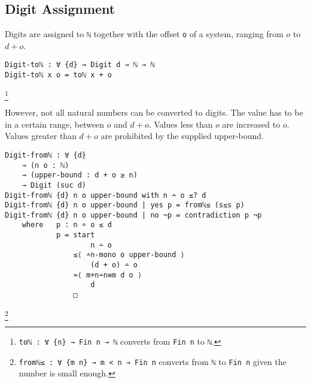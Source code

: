 \documentclass[\main/thesis.tex]{subfiles}
\begin{document}
\subsection{Digit Assignment}

\begin{center}
    \begin{adjustbox}{max width=\textwidth}
    \end{adjustbox}
\end{center}

Digits are assigned to {\lstinline|ℕ|} together with the offset {\lstinline|o|}
of a system, ranging from $ o $ to $ d + o $.

\begin{lstlisting}
Digit-toℕ : ∀ {d} → Digit d → ℕ → ℕ
Digit-toℕ x o = toℕ x + o
\end{lstlisting}
\footnote{
    {\lstinline|toℕ : ∀ {n} → Fin n → ℕ|}
    \newline\hspace*{4em} converts from {\lstinline|Fin n|} to {\lstinline|ℕ|}.
}

However, not all natural numbers can be converted to digits.
The value has to be in a certain range, between $ o $ and $ d + o $.
Values less than $ o $ are increased to $ o $.
Values greater than $ d + o $ are prohibited by the supplied upper-bound.

\begin{lstlisting}
Digit-fromℕ : ∀ {d}
    → (n o : ℕ)
    → (upper-bound : d + o ≥ n)
    → Digit (suc d)
Digit-fromℕ {d} n o upper-bound with n ∸ o ≤? d
Digit-fromℕ {d} n o upper-bound | yes p = fromℕ≤ (s≤s p)
Digit-fromℕ {d} n o upper-bound | no ¬p = contradiction p ¬p
    where   p : n ∸ o ≤ d
            p = start
                    n ∸ o
                ≤⟨ ∸n-mono o upper-bound ⟩
                    (d + o) ∸ o
                ≈⟨ m+n∸n≡m d o ⟩
                    d
                □
\end{lstlisting}
\footnote{
    {\lstinline|fromℕ≤ : ∀ {m n} → m < n → Fin n|}
    \newline\hspace*{4em} converts from {\lstinline|ℕ|} to {\lstinline|Fin n|} given the number is small enough.
}
\end{document}
